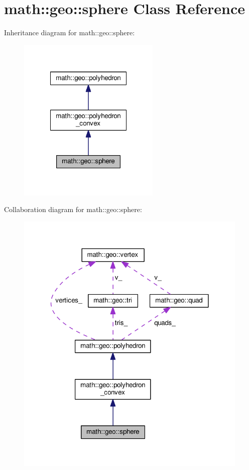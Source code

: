 \hypertarget{classmath_1_1geo_1_1sphere}{\section{math\-:\-:geo\-:\-:sphere Class Reference}
\label{classmath_1_1geo_1_1sphere}
}


Inheritance diagram for math\-:\-:geo\-:\-:sphere\-:
\nopagebreak
\begin{figure}[H]
\begin{center}
\leavevmode
\includegraphics[width=192pt]{classmath_1_1geo_1_1sphere__inherit__graph}
\end{center}
\end{figure}


Collaboration diagram for math\-:\-:geo\-:\-:sphere\-:
\nopagebreak
\begin{figure}[H]
\begin{center}
\leavevmode
\includegraphics[width=315pt]{classmath_1_1geo_1_1sphere__coll__graph}
\end{center}
\end{figure}
